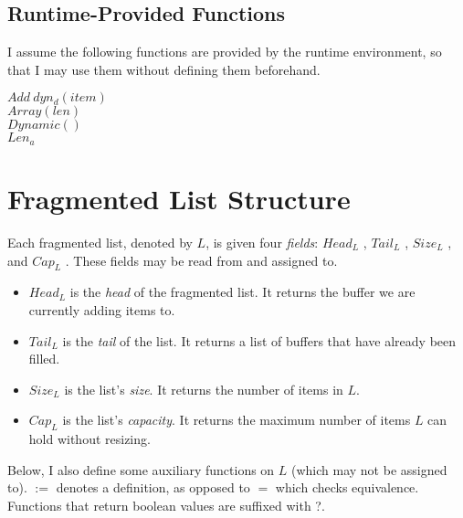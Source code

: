\documentclass{article}
\newcommand{\head}{
	\ensuremath{Head_L}
}
\newcommand{\tail}{
	\ensuremath{Tail_L}
}
\newcommand{\size}{
	\ensuremath{Size_L}
}
\newcommand{\capacity}{
	\ensuremath{Cap_L}
}
\begin{document}

	\subsection{Runtime-Provided Functions}
	
	I assume the following functions are provided by the runtime environment, so that I may use them without defining them beforehand.
	
	\begin{algorithm}\begin{algorithmic}
			\State $Add\ dyn_{d}(item)$
			\\
			\State $Array(len)$
			\\
			\State $Dynamic()$
			\\
			\State $Len_a$
		\end{algorithmic}\end{algorithm}
	
	\section{Fragmented List Structure}
	\label{Fragmented List Structure}

	Each fragmented list, denoted by $L$, is given four \textit{fields}: \head, \tail, \size, and \capacity. These fields may be read from and assigned to.
	
	\begin{itemize}
		\item \head is the \textit{head} of the fragmented list. It returns the buffer we are currently adding items to.
		\item \tail is the \textit{tail} of the list. It returns a list of buffers that have already been filled.
		\item \size is the list's \textit{size}. It returns the number of items in $L$.
		\item \capacity is the list's \textit{capacity}. It returns the maximum number of items $L$ can hold without resizing.
	\end{itemize}
	
	Below, I also define some auxiliary functions on $L$ (which may not be assigned to). $:=$ denotes a definition, as opposed to $=$ which checks equivalence. Functions that return boolean values are suffixed with ?.
	
\end{document}
